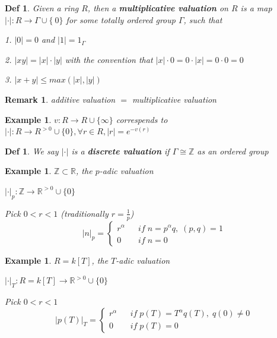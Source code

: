\documentclass{article}
\newtheorem{definition}[theorem]{Def}
\newtheorem{example}[theorem]{Example}
\newtheorem{remark}[theorem]{Remark}
\begin{document}
\begin{definition}
Given a ring $R$, then a \textbf{multiplicative valuation} on $R$ is a map $|\cdot| : R \to \Gamma \cup \{\ 0 \}$ for some totally
ordered group $\Gamma$, such that

1. $|0| = 0$ and $|1| = 1_\Gamma$

2. $|xy| = |x|\cdot |y|$ with the convention that $|x|\cdot0 = 0\cdot|x| = 0 \cdot 0 = 0$

3. $|x + y| \leq max(|x|, |y|)$
\end{definition}

\begin{remark}
    additive valuation $=$ multiplicative valuation
\end{remark}

\begin{example}
    $v:R\to R\cup\{\infty\}$ correspends to $|\cdot|:R\to R^{>0}\cup\{0\},\forall r\in R, |r|=e^{-v(r)}$
\end{example}

\begin{definition}
    We say $|\cdot|$ is a \textbf{discrete valuation} if $\Gamma\cong\mathbb Z$ as an ordered group
\end{definition}

\begin{example}
    $\mathbb Z\subset \mathbb R$, the $p$-adic valuation

    $|\cdot|_p: \mathbb Z\to \mathbb R^{>0}\cup\{0\}$

    Pick $0<r<1$ (traditionally $r=\frac{1}{p}$)
$$ 
|n|_p=\left\{
\begin{array}{rcl}
r^\alpha       &      & if\;n=p^\alpha q,\;(p,q)=1 \\
0     &      & if\;n=0
\end{array} \right. $$
\end{example}

\begin{example}
    $R=k[T]$, the $T$-adic valuation

    $|\cdot|_T: R=k[T]\to \mathbb R^{>0}\cup\{0\}$

    Pick $0<r<1$ 
$$ 
|p(T)|_T=\left\{
\begin{array}{rcl}
r^\alpha       &      & if\;p(T)=T^\alpha q(T),\;q(0)\ne 0 \\
0     &      & if\;p(T)=0
\end{array} \right. $$
\end{example}
\end{document}

